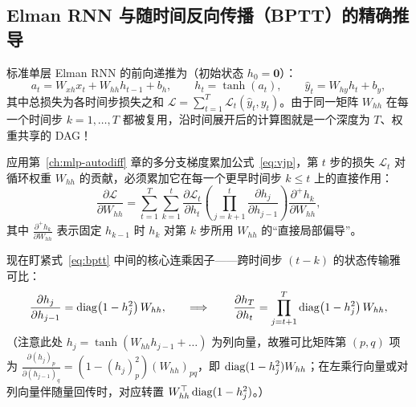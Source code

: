 \subsection{Elman RNN 与随时间反向传播（BPTT）的精确推导}

标准单层 Elman RNN 的前向递推为（初始状态 $h_0 = \mathbf{0}$）：
\begin{equation}
  a_t = W_{xh} x_t + W_{hh} h_{t-1} + b_h, \qquad
  h_t = \tanh(a_t), \qquad
  \hat{y}_t = W_{hy} h_t + b_y,
  \label{eq:elman-rnn}
\end{equation}
其中总损失为各时间步损失之和 $\mathcal{L} = \sum_{t=1}^{T} \mathcal{L}_t(\hat{y}_t, y_t)$。由于同一矩阵 $W_{hh}$ 在每一个时间步 $k = 1, \dots, T$ 都被复用，沿时间展开后的计算图就是一个深度为 $T$、权重共享的 DAG！

应用第~\ref{ch:mlp-autodiff} 章的多分支梯度累加公式~\eqref{eq:vjp}，第 $t$ 步的损失 $\mathcal{L}_t$ 对循环权重 $W_{hh}$ 的贡献，必须累加它在每一个更早时间步 $k \le t$ 上的直接作用：
\begin{equation}
  \frac{\partial \mathcal{L}}{\partial W_{hh}}
  = \sum_{t=1}^{T} \sum_{k=1}^{t}
    \frac{\partial \mathcal{L}_t}{\partial h_t}
    \left(\prod_{j=k+1}^{t} \frac{\partial h_j}{\partial h_{j-1}}\right)
    \frac{\partial^+ h_k}{\partial W_{hh}},
  \label{eq:bptt}
\end{equation}
其中 $\frac{\partial^+ h_k}{\partial W_{hh}}$ 表示固定 $h_{k-1}$ 时 $h_k$ 对第 $k$ 步所用 $W_{hh}$ 的“直接局部偏导”。

现在盯紧式~\eqref{eq:bptt} 中间的核心连乘因子——跨时间步 $(t - k)$ 的状态传输雅可比：
\begin{equation}
  \frac{\partial h_j}{\partial h_{j-1}} = \operatorname{diag}\!\left(1 - h_j^2\right) W_{hh},
  \qquad\Longrightarrow\qquad
  \frac{\partial h_T}{\partial h_t} = \prod_{j=t+1}^{T} \operatorname{diag}\!\left(1 - h_j^2\right) W_{hh},
  \label{eq:bptt-jacobian}
\end{equation}
（注意此处 $h_j = \tanh(W_{hh} h_{j-1} + \dots)$ 为列向量，故雅可比矩阵第 $(p,q)$ 项为 $\frac{\partial (h_j)_p}{\partial (h_{j-1})_q} = (1 - (h_j)_p^2)(W_{hh})_{pq}$，即 $\operatorname{diag}(1 - h_j^2) W_{hh}$；在左乘行向量或对列向量伴随量回传时，对应转置 $W_{hh}^\top \operatorname{diag}(1 - h_j^2)$。）

